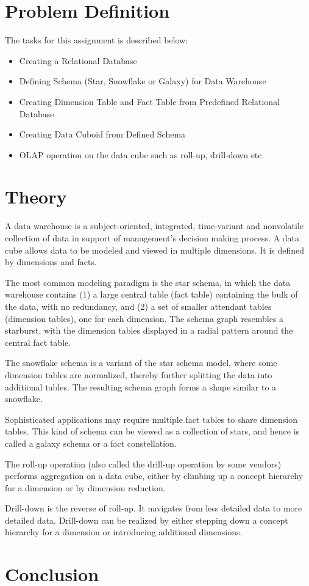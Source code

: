 \documentclass[12pt]{article}
\begin{document}
\maketitle
\thispagestyle{empty}
\clearpage
\newpage

\section{Problem Definition}
The tasks for this assignment is described below:
\begin{itemize}
	\item Creating a Relational Database
	\item Defining Schema (Star, Snowflake or Galaxy) for Data Warehouse
	\item Creating Dimension Table and Fact Table from Predefined Relational Database
	\item Creating Data Cuboid from Defined Schema
	\item OLAP operation on the data cube such as roll-up, drill-down etc.
\end{itemize}

\section{Theory}
A data warehouse is a subject-oriented, integrated, time-variant and nonvolatile collection of data in support of management’s decision making process. A data cube allows data to be modeled and viewed in multiple
dimensions. It is defined by dimensions and facts.

The most common modeling paradigm is the star schema, in which the data warehouse contains (1) a large central table (fact table) containing the bulk of the data, with no redundancy, and (2) a set of smaller attendant tables (dimension tables), one for each dimension. The schema graph resembles a starburst, with the dimension tables displayed in a radial pattern around the central fact table.

The snowflake schema is a variant of the star schema model, where some dimension tables are normalized, thereby further splitting the data into additional tables. The resulting schema graph forms a shape similar to a snowflake.

Sophisticated applications may require multiple fact tables to share dimension tables. This kind of schema can be viewed as a collection of stars, and hence is called a galaxy schema or a fact constellation.

The roll-up operation (also called the drill-up operation by some vendors)
performs aggregation on a data cube, either by climbing up a concept hierarchy for a dimension or by dimension reduction.

Drill-down is the reverse of roll-up. It navigates from less detailed data to more detailed data. Drill-down can be realized by either stepping down a concept hierarchy for a dimension or introducing additional dimensions.

\section{Conclusion}
\end{document}
